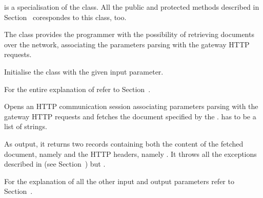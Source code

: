 \documentclass{ozdoc}
\begin{document}



 is a specialisation of the  class. All the public and protected methods described in Section~ corespondes to this class, too.

The  class provides the programmer with the possibility of retrieving documents over the network, associating the parameters parsing with the gateway  HTTP requests. \mozartEMPTY
 \mozartEMPTY
\begin{mozartDESCRIPTION}
\mozartENTRYHASCODE
\begin{mozartSYNOPSIS}
\begin{mozartCODEDISPLAY}\mozartFACETEXT{)}\end{mozartCODEDISPLAY}
\end{mozartSYNOPSIS}
\mozartITEM Initialise the class with the given  input parameter.

  \mozartEMPTY
For the entire explanation of  refer to Section~. \mozartEMPTY
{}\mozartENTRYHASCODE
\begin{mozartSYNOPSIS}
\begin{mozartCODEDISPLAY}\mozartFACETEXT{\mozartSPACE{}}\mozartFACETEXT{\mozartSPACE{}}\mozartFACETEXT{\mozartSPACE{}}\mozartFACETEXT{)}\end{mozartCODEDISPLAY}
\end{mozartSYNOPSIS}
\mozartITEM Opens an HTTP communication session associating  parameters parsing with the gateway  HTTP requests and fetches the document specified by the .  has to be a list of  strings.

As output, it returns two records containing both the content of the fetched document, namely  and the HTTP headers, namely . It throws all the exceptions described in (see Section~) but .  

For the explanation of all the other input and output parameters refer to Section~. \mozartEMPTY
\end{mozartDESCRIPTION}
\end{document}
